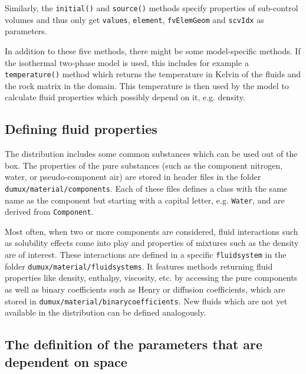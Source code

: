 Similarly, the \texttt{initial()} and \texttt{source()} methods
specify properties of sub-control volumes and thus only get
\texttt{values}, \texttt{element}, \texttt{fvElemGeom} and
\texttt{scvIdx} as parameters.

In addition to these five methods, there might be some model-specific
methods. If the isothermal two-phase model is used, this includes 
for example a \texttt{temperature()} method which returns the temperature in Kelvin
of the fluids and the rock matrix in the domain. This temperature is
then used by the model to calculate fluid properties which possibly
depend on it, e.g. density.


\subsection{Defining fluid properties}\label{tutorial-coupled:description-fluid-class}

The \Dumux distribution includes some common substances which can be used
out of the box. The properties of the pure substances (such as the component 
nitrogen, water, or pseudo-component air) are stored in header files in 
the folder \verb+dumux/material/components+. Each of these files 
defines a class with the same name as the component but starting with a capital
letter, e.g. \texttt{Water}, and are derived from \texttt{Component}.

Most often, when two or more components are considered, fluid interactions 
such as solubility effects come into play and properties of mixtures such as 
the density are of interest. These interactions are defined in
a specific \verb+fluidsystem+ in the folder \verb+dumux/material/fluidsystems+.
It features methods returning fluid properties like density, enthalpy, viscosity,
etc. by accessing the pure components as well as binary coefficients such as
Henry or diffusion coefficients, which are stored in 
\verb+dumux/material/binarycoefficients+. New fluids which are not yet
 available in the \Dumux distribution can be defined analogously.


\subsection{The definition of the parameters that are dependent on space}\label{tutorial-coupled:description-spatialParameters}

